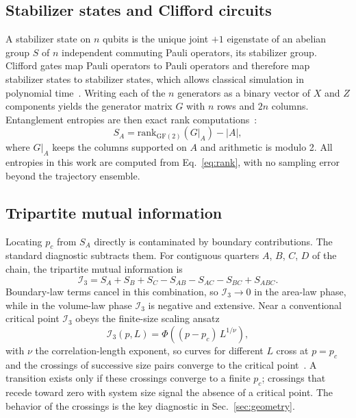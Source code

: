 \documentclass[aps,prb,twocolumn,superscriptaddress,nofootinbib]{revtex4-2}
\newcommand{\I}{\mathcal{I}}
\begin{document}
\subsection{Stabilizer states and Clifford circuits}
A stabilizer state on $n$ qubits is the unique joint $+1$ eigenstate of
an abelian group $S$ of $n$ independent commuting Pauli operators, its
stabilizer group. Clifford gates map Pauli operators to Pauli operators
and therefore map stabilizer states to stabilizer states, which allows
classical simulation in polynomial time~\cite{AaronsonGottesman2004}.
Writing each of the $n$ generators as a binary vector of $X$ and $Z$
components yields the generator matrix $G$ with $n$ rows and $2n$
columns. Entanglement entropies are then exact rank
computations~\cite{Fattal2004}:
\begin{equation}
S_A = \mathrm{rank}_{\mathrm{GF}(2)}\!\left(G|_A\right) - |A|,
\label{eq:rank}
\end{equation}
where $G|_A$ keeps the columns supported on $A$ and arithmetic is
modulo 2. All entropies in this work are computed from
Eq.~\eqref{eq:rank}, with no sampling error beyond the trajectory
ensemble.

\subsection{Tripartite mutual information}
Locating $p_c$ from $S_A$ directly is contaminated by boundary
contributions. The standard diagnostic subtracts them. For contiguous
quarters $A$, $B$, $C$, $D$ of the chain, the tripartite mutual
information is
\begin{equation}
\I_3 = S_A + S_B + S_C - S_{AB} - S_{AC} - S_{BC} + S_{ABC}.
\label{eq:i3}
\end{equation}
Boundary-law terms cancel in this combination, so $\I_3 \to 0$ in the
area-law phase, while in the volume-law phase $\I_3$ is negative and
extensive. Near a conventional critical point $\I_3$ obeys the
finite-size scaling ansatz
\begin{equation}
\I_3(p, L) = \Phi\!\left((p - p_c)\, L^{1/\nu}\right),
\label{eq:fss}
\end{equation}
with $\nu$ the correlation-length exponent, so curves for different $L$
cross at $p = p_c$ and the crossings of successive size pairs converge to
the critical point~\cite{Gullans2020,Zabalo2020}. A transition exists
only if these crossings converge to a finite $p_c$; crossings that recede
toward zero with system size signal the absence of a critical point. The
behavior of the crossings is the key diagnostic in
Sec.~\ref{sec:geometry}.
\end{document}
